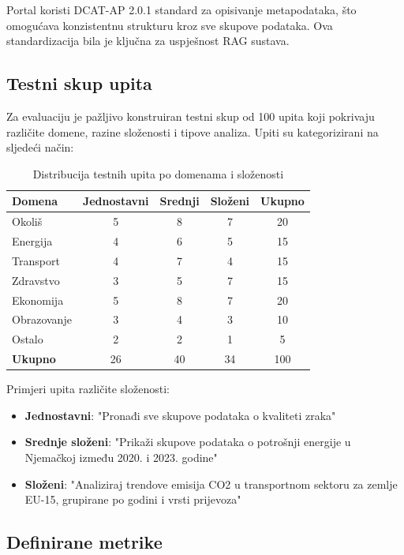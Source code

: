 Portal koristi DCAT-AP 2.0.1 standard za opisivanje metapodataka, što omogućava konzistentnu strukturu kroz sve skupove podataka. Ova standardizacija bila je ključna za uspješnost RAG sustava.

\subsection{Testni skup upita}

Za evaluaciju je pažljivo konstruiran testni skup od 100 upita koji pokrivaju različite domene, razine složenosti i tipove analiza. Upiti su kategorizirani na sljedeći način:

\begin{table}[htbp]
\centering
\caption{Distribucija testnih upita po domenama i složenosti}
\label{tab:test_queries_distribution}
\begin{tabular}{|l|c|c|c|c|}
\hline
\textbf{Domena} & \textbf{Jednostavni} & \textbf{Srednji} & \textbf{Složeni} & \textbf{Ukupno} \\
\hline
Okoliš & 5 & 8 & 7 & 20 \\
Energija & 4 & 6 & 5 & 15 \\
Transport & 4 & 7 & 4 & 15 \\
Zdravstvo & 3 & 5 & 7 & 15 \\
Ekonomija & 5 & 8 & 7 & 20 \\
Obrazovanje & 3 & 4 & 3 & 10 \\
Ostalo & 2 & 2 & 1 & 5 \\
\hline
\textbf{Ukupno} & 26 & 40 & 34 & 100 \\
\hline
\end{tabular}
\end{table}

Primjeri upita različite složenosti:

\begin{itemize}
    \item \textbf{Jednostavni}: "Pronađi sve skupove podataka o kvaliteti zraka"
    \item \textbf{Srednje složeni}: "Prikaži skupove podataka o potrošnji energije u Njemačkoj između 2020. i 2023. godine"
    \item \textbf{Složeni}: "Analiziraj trendove emisija CO2 u transportnom sektoru za zemlje EU-15, grupirane po godini i vrsti prijevoza"
\end{itemize}

\subsection{Definirane metrike}

